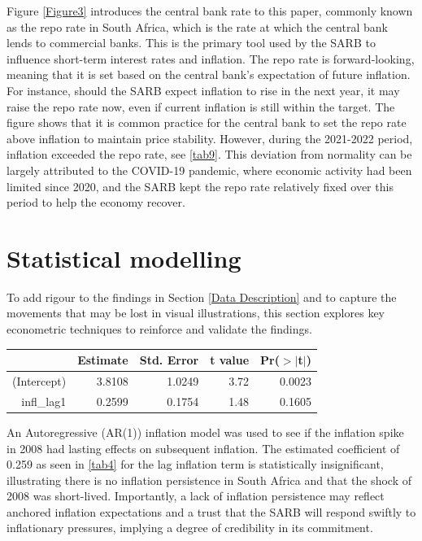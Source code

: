 \documentclass[11pt,preprint]{elsarticle}
\let\origtable\table
\let\endorigtable\endtable
\renewenvironment{table}[1][2] {
    \expandafter\origtable\expandafter[H]
} {
    \endorigtable
}
\numberwithin{equation}{section}
\numberwithin{figure}{section}
\numberwithin{table}{section}
\begin{document}
Figure \ref{Figure3} introduces the central bank rate to this paper,
commonly known as the repo rate in South Africa, which is the rate at
which the central bank lends to commercial banks. This is the primary
tool used by the SARB to influence short-term interest rates and
inflation. The repo rate is forward-looking, meaning that it is set
based on the central bank's expectation of future inflation. For
instance, should the SARB expect inflation to rise in the next year, it
may raise the repo rate now, even if current inflation is still within
the target. The figure shows that it is common practice for the central
bank to set the repo rate above inflation to maintain price stability.
However, during the 2021-2022 period, inflation exceeded the repo rate,
see \ref{tab9}. This deviation from normality can be largely attributed
to the COVID-19 pandemic, where economic activity had been limited since
2020, and the SARB kept the repo rate relatively fixed over this period
to help the economy recover.

\section{\texorpdfstring{Statistical
modelling\label{Statistical modelling}}{Statistical modelling}}\label{statistical-modelling}

To add rigour to the findings in Section \ref{Data Description} and to
capture the movements that may be lost in visual illustrations, this
section explores key econometric techniques to reinforce and validate
the findings.

\begin{table}[H]
\centering
\begin{tabular}{rrrrr}
  \hline
 & Estimate & Std. Error & t value & Pr($>$$|$t$|$) \\ 
  \hline
(Intercept) & 3.8108 & 1.0249 & 3.72 & 0.0023 \\ 
  infl\_lag1 & 0.2599 & 0.1754 & 1.48 & 0.1605 \\ 
   \hline
\end{tabular}
\caption{Inflation Persistence in South Africa (2008-2024) \label{tab4}} 
\end{table}

An Autoregressive (AR(1)) inflation model was used to see if the
inflation spike in 2008 had lasting effects on subsequent inflation. The
estimated coefficient of 0.259 as seen in \ref{tab4} for the lag
inflation term is statistically insignificant, illustrating there is no
inflation persistence in South Africa and that the shock of 2008 was
short-lived. Importantly, a lack of inflation persistence may reflect
anchored inflation expectations and a trust that the SARB will respond
swiftly to inflationary pressures, implying a degree of credibility in
its commitment.
\end{document}
